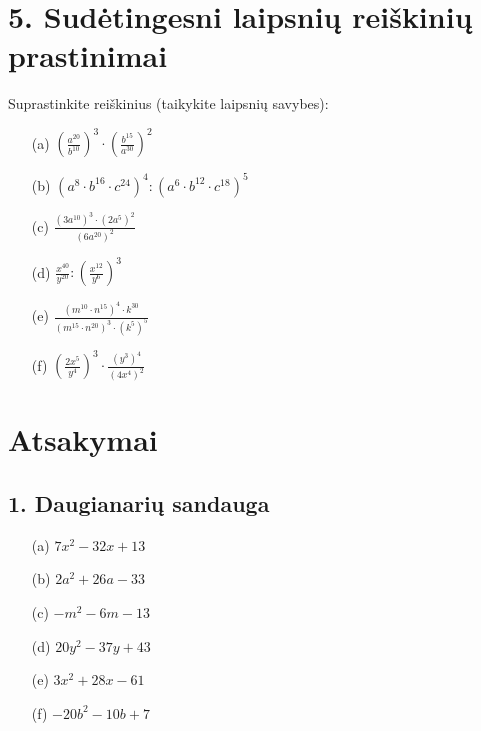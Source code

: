 \documentclass[12pt, a4paper]{article}
\begin{document}
\section*{5. Sudėtingesni laipsnių reiškinių prastinimai}
Suprastinkite reiškinius (taikykite laipsnių savybes):
\begin{multicols}{2}
\begin{enumerate}
    \item[(a)] $\left(\frac{a^{20}}{b^{10}}\right)^3 \cdot \left(\frac{b^{15}}{a^{30}}\right)^2$
    \item[(b)] $(a^8 \cdot b^{16} \cdot c^{24})^4 : (a^6 \cdot b^{12} \cdot c^{18})^5$
    \item[(c)] $\frac{(3a^{10})^3 \cdot (2a^5)^2}{(6a^{20})^2}$
    \item[(d)] $\frac{x^{40}}{y^{20}} : \left(\frac{x^{12}}{y^6}\right)^3$
    \item[(e)] $\frac{(m^{10} \cdot n^{15})^4 \cdot k^{30}}{(m^{15} \cdot n^{20})^3 \cdot (k^5)^5}$
    \item[(f)] $\left(\frac{2x^5}{y^4}\right)^3 \cdot \frac{(y^3)^4}{(4x^4)^2}$
\end{enumerate}
\end{multicols}

\newpage
\section*{Atsakymai}

\subsection*{1. Daugianarių sandauga}
\begin{multicols}{2}
\begin{enumerate}
    \item[(a)] $7x^2 - 32x + 13$
    \item[(b)] $2a^2 + 26a - 33$
    \item[(c)] $-m^2 - 6m - 13$
    \item[(d)] $20y^2 - 37y + 43$
    \item[(e)] $3x^2 + 28x - 61$
    \item[(f)] $-20b^2 - 10b + 7$
\end{enumerate}
\end{multicols}
\end{document}
